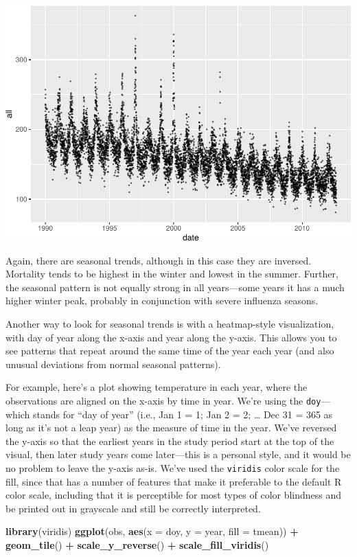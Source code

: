 \documentclass[
]{book}
\newenvironment{Shaded}{\begin{snugshade}}{\end{snugshade}}
\newcommand{\DataTypeTok}[1]{\textcolor[rgb]{0.13,0.29,0.53}{#1}}
\newcommand{\KeywordTok}[1]{\textcolor[rgb]{0.13,0.29,0.53}{\textbf{#1}}}
\newcommand{\NormalTok}[1]{#1}
\newcommand{\OperatorTok}[1]{\textcolor[rgb]{0.81,0.36,0.00}{\textbf{#1}}}
\newcommand{\StringTok}[1]{\textcolor[rgb]{0.31,0.60,0.02}{#1}}
\begin{document}
\includegraphics{adv_epi_analysis_files/figure-latex/unnamed-chunk-11-1.pdf}

Again, there are seasonal trends, although in this case they are inversed.
Mortality tends to be highest in the winter and lowest in the summer. Further, the
seasonal pattern is not equally strong in all years---some years it has a much
higher winter peak, probably in conjunction with severe influenza seasons.

Another way to look for seasonal trends is with a heatmap-style visualization,
with day of year along the x-axis and year along the y-axis. This allows you
to see patterns that repeat around the same time of the year each year (and
also unusual deviations from normal seasonal patterns).

For example, here's a plot showing temperature in each year, where the
observations are aligned on the x-axis by time in year. We're using the \texttt{doy}---which stands for ``day of year'' (i.e., Jan 1 = 1; Jan 2 = 2; \ldots{} Dec 31 = 365 as long
as it's not a leap year) as the measure of time in the year. We've reversed
the y-axis so that the earliest years in the study period start at the top
of the visual, then later study years come later---this is a personal style,
and it would be no problem to leave the y-axis as-is. We've used the
\texttt{viridis} color scale for the fill, since that has a number of features
that make it preferable to the default R color scale, including that it
is perceptible for most types of color blindness and be printed out in grayscale
and still be correctly interpreted.

\begin{Shaded}
\begin{Highlighting}[]
\KeywordTok{library}\NormalTok{(viridis)}
\KeywordTok{ggplot}\NormalTok{(obs, }\KeywordTok{aes}\NormalTok{(}\DataTypeTok{x =}\NormalTok{ doy, }\DataTypeTok{y =}\NormalTok{ year, }\DataTypeTok{fill =}\NormalTok{ tmean)) }\OperatorTok{+}\StringTok{ }
\StringTok{  }\KeywordTok{geom_tile}\NormalTok{() }\OperatorTok{+}
\StringTok{  }\KeywordTok{scale_y_reverse}\NormalTok{() }\OperatorTok{+}\StringTok{ }
\StringTok{  }\KeywordTok{scale_fill_viridis}\NormalTok{()}
\end{Highlighting}
\end{Shaded}
\end{document}

